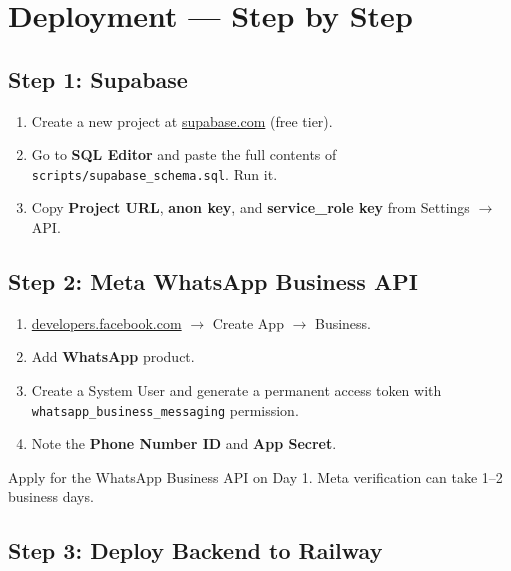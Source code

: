\documentclass[11pt, a4paper]{article}
\begin{document}
\newpage

\section{Deployment — Step by Step}

\subsection{Step 1: Supabase}

\begin{enumerate}[leftmargin=1.5em]
  \item Create a new project at \href{https://supabase.com}{supabase.com} (free tier).
  \item Go to \textbf{SQL Editor} and paste the full contents of \texttt{scripts/supabase\_schema.sql}. Run it.
  \item Copy \textbf{Project URL}, \textbf{anon key}, and \textbf{service\_role key} from Settings $\rightarrow$ API.
\end{enumerate}

\subsection{Step 2: Meta WhatsApp Business API}

\begin{enumerate}[leftmargin=1.5em]
  \item \href{https://developers.facebook.com}{developers.facebook.com} $\rightarrow$ Create App $\rightarrow$ Business.
  \item Add \textbf{WhatsApp} product.
  \item Create a System User and generate a permanent access token with \texttt{whatsapp\_business\_messaging} permission.
  \item Note the \textbf{Phone Number ID} and \textbf{App Secret}.
\end{enumerate}

\begin{notebox}
Apply for the WhatsApp Business API on Day 1. Meta verification can take 1--2 business days.
\end{notebox}

\subsection{Step 3: Deploy Backend to Railway}
\end{document}
